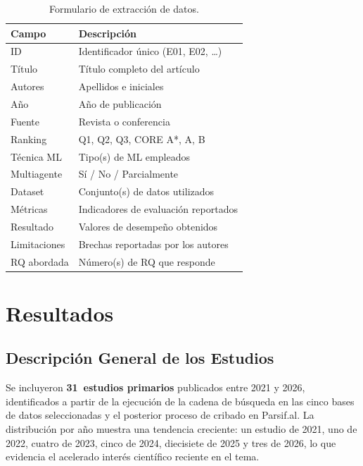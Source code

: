 \documentclass[12pt, a4paper]{article}
\begin{document}
\begin{table}[H]
\centering
\caption{Formulario de extracci\'on de datos.}
\label{tab:extraccion}
\begin{tabularx}{\linewidth}{lX}
\toprule
\textbf{Campo} & \textbf{Descripci\'on} \\
\midrule
ID             & Identificador \'unico (E01, E02, \ldots) \\
T\'itulo       & T\'itulo completo del art\'iculo \\
Autores        & Apellidos e iniciales \\
A\~no          & A\~no de publicaci\'on \\
Fuente         & Revista o conferencia \\
Ranking        & Q1, Q2, Q3, CORE A*, A, B \\
T\'ecnica ML   & Tipo(s) de ML empleados \\
Multiagente    & S\'i / No / Parcialmente \\
Dataset        & Conjunto(s) de datos utilizados \\
M\'etricas     & Indicadores de evaluaci\'on reportados \\
Resultado      & Valores de desempe\~no obtenidos \\
Limitaciones   & Brechas reportadas por los autores \\
RQ abordada    & N\'umero(s) de RQ que responde \\
\bottomrule
\end{tabularx}
\end{table}

\section{Resultados}

\subsection{Descripci\'on General de los Estudios}

Se incluyeron \textbf{31~estudios primarios} publicados entre 2021 y 2026,
identificados a partir de la ejecuci\'on de la cadena de b\'usqueda en las
cinco bases de datos seleccionadas y el posterior proceso de cribado en
Parsif.al. La distribuci\'on por a\~no muestra una tendencia creciente: un
estudio de 2021, uno de 2022, cuatro de 2023, cinco de 2024, diecisiete de
2025 y tres de 2026, lo que evidencia el acelerado inter\'es cient\'ifico
reciente en el tema.
\end{document}
